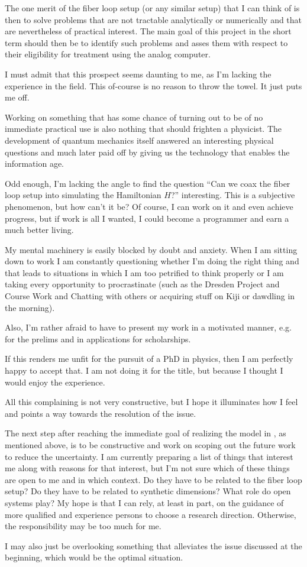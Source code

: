 \documentclass[fontsize=10pt,paper=a4,open=any,
twoside=no,toc=listof,toc=bibliography,headings=optiontohead,
captions=nooneline,captions=tableabove,english,DIV=15,numbers=noenddot,final,parskip=half-,
headinclude=true,footinclude=false,BCOR=0mm]{scrartcl}
\begin{document}
The one merit of the fiber loop setup (or any similar setup) that I
can think of is then to solve problems that are not tractable
analytically or numerically and that are nevertheless of practical
interest. The main goal of this project in the short term should then
be to identify such problems and asses them with respect to their
eligibility for treatment using the analog computer.

I must admit that this prospect seems daunting to me, as I'm lacking
the experience in the field. This of-course is no reason to throw the
towel. It just puts me off.

Working on something that has some chance of turning out to be of no
immediate practical use is also nothing that should frighten a
physicist. The development of quantum mechanics itself answered an
interesting physical questions and much later paid off by giving us
the technology that enables the information age.

Odd enough, I'm lacking the angle to find the question ``Can we coax
the fiber loop setup into simulating the Hamiltonian \(H\)?''
interesting. This is a subjective phenomenon, but how can't it be?  Of
course, I can work on it and even achieve progress, but if work is all
I wanted, I could become a programmer and earn a much better living.

My mental machinery is easily blocked by doubt and anxiety. When I am
sitting down to work I am constantly questioning whether I'm doing the
right thing and that leads to situations in which I am too petrified
to think properly or I am taking every opportunity to procrastinate
(such as the Dresden Project and Course Work and Chatting with others
or acquiring stuff on Kiji or dawdling in the morning).

Also, I'm rather afraid to have to present my work in a motivated
manner, e.g. for the prelims and in applications for scholarships.

If this renders me unfit for the pursuit of a PhD in physics, then I
am perfectly happy to accept that. I am not doing it for the title,
but because I thought I would enjoy the experience.

All this complaining is not very constructive, but I hope it
illuminates how I feel and points a way towards the resolution of the
issue.

The next step after reaching the immediate goal of realizing the model
in , as mentioned above, is to be constructive
and work on scoping out the future work to reduce the uncertainty. I
am currently preparing a list of things that interest me along with
reasons for that interest, but I'm not sure which of these things are
open to me and in which context. Do they have to be related to the
fiber loop setup? Do they have to be related to synthetic dimensions?
What role do open systems play? My hope is that I can rely, at least
in part, on the guidance of more qualified and experience persons to
choose a research direction. Otherwise, the responsibility may be too
much for me.

I may also just be overlooking something that alleviates the issue
discussed at the beginning, which would be the optimal situation.

\printbibliography{}
\end{document}

